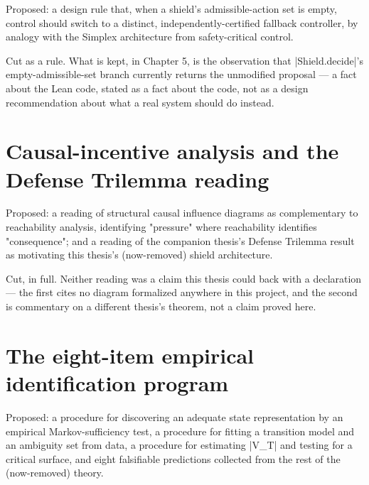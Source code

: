 \documentclass{memoir}
\begin{document}
Proposed: a design rule that, when a shield's admissible-action set is
empty, control should switch to a distinct, independently-certified
fallback controller, by analogy with the Simplex architecture from
safety-critical control.

Cut as a rule. What is kept, in Chapter 5, is the observation that
\LeanVerb|Shield.decide|'s empty-admissible-set branch currently returns the
unmodified proposal — a fact about the Lean code, stated as a fact about
the code, not as a design recommendation about what a real system should
do instead.



\section{Causal-incentive analysis and the Defense Trilemma reading}\label{Capability--Monotonicity--in--a--Formal--Skeleton--for--Agentic--AI--Safety----What--Was--Cut-005F-005F-005F--and--Why----Causal--incentive--analysis--and--the--Defense--Trilemma--reading}

Proposed: a reading of structural causal influence diagrams as
complementary to reachability analysis, identifying "pressure" where
reachability identifies "consequence"; and a reading of the companion
thesis's Defense Trilemma result as motivating this thesis's (now-removed)
shield architecture.

Cut, in full. Neither reading was a claim this thesis could back with a
declaration — the first cites no diagram formalized anywhere in this
project, and the second is commentary on a different thesis's theorem, not
a claim proved here.



\section{The eight-item empirical identification program}\label{Capability--Monotonicity--in--a--Formal--Skeleton--for--Agentic--AI--Safety----What--Was--Cut-005F-005F-005F--and--Why----The--eight--item--empirical--identification--program}

Proposed: a procedure for discovering an adequate state representation by
an empirical Markov-sufficiency test, a procedure for fitting a transition
model and an ambiguity set from data, a procedure for estimating \LeanVerb|V_T| and
testing for a critical surface, and eight falsifiable predictions collected
from the rest of the (now-removed) theory.
\end{document}

